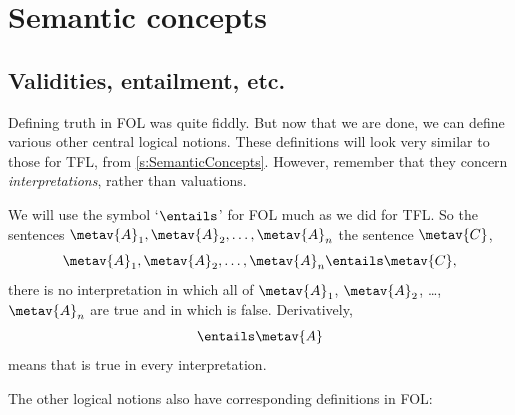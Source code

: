 \chapter{Semantic concepts}

\section{Validities, entailment, etc.}

Defining truth in FOL was quite fiddly. But now that we are done, we can define various other central logical notions. These definitions will look very similar to those for TFL, from \cref{s:SemanticConcepts}. However, remember that they concern \emph{interpretations}, rather than valuations.

We will use the symbol `$\entails$' for FOL much as we did for TFL. So
the sentences $\metav{A}_1, \metav{A}_2, \ldots, \metav{A}_n$
 the sentence $\metav{C}$,
	$$\metav{A}_1, \metav{A}_2, \ldots, \metav{A}_n \entails\metav{C},$$
\ifeff{} there is no interpretation in which all of $\metav{A}_1$, $\metav{A}_2$, \dots, $\metav{A}_n$ are true and in which  is false. Derivatively,
	$$\entails\metav{A}$$
means that  is true in every interpretation.

The other logical notions also have corresponding definitions in FOL:

